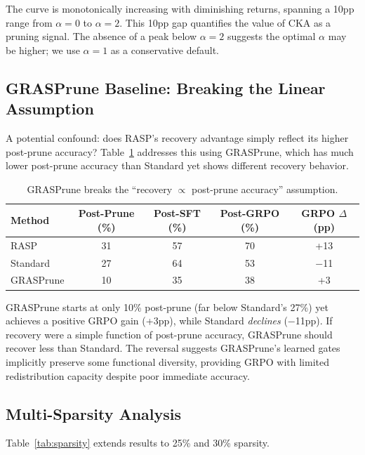 \documentclass[11pt,a4paper]{article}
\newcommand{\method}{RASP}
\begin{document}
The curve is monotonically increasing with diminishing returns, spanning a 10pp range from $\alpha=0$ to $\alpha=2$. This 10pp gap quantifies the value of CKA as a pruning signal. The absence of a peak below $\alpha=2$ suggests the optimal $\alpha$ may be higher; we use $\alpha=1$ as a conservative default.

\subsection{GRASPrune Baseline: Breaking the Linear Assumption}
\label{sec:graspprune}

A potential confound: does \method{}'s recovery advantage simply reflect its higher post-prune accuracy? Table~\ref{tab:graspprune} addresses this using GRASPrune, which has much lower post-prune accuracy than Standard yet shows different recovery behavior.

\begin{table}[t]
\centering
\small
\caption{GRASPrune breaks the ``recovery $\propto$ post-prune accuracy'' assumption.}
\label{tab:graspprune}
\begin{tabular}{lcccc}
\toprule
\textbf{Method} & \textbf{Post-Prune (\%)} & \textbf{Post-SFT (\%)} & \textbf{Post-GRPO (\%)} & \textbf{GRPO $\Delta$ (pp)} \\
\midrule
\method{} & 31 & 57 & 70 & +13 \\
Standard & 27 & 64 & 53 & $-$11 \\
GRASPrune & 10 & 35 & 38 & +3 \\
\bottomrule
\end{tabular}
\end{table}

GRASPrune starts at only 10\% post-prune (far below Standard's 27\%) yet achieves a positive GRPO gain (+3pp), while Standard \emph{declines} ($-$11pp). If recovery were a simple function of post-prune accuracy, GRASPrune should recover less than Standard. The reversal suggests GRASPrune's learned gates implicitly preserve some functional diversity, providing GRPO with limited redistribution capacity despite poor immediate accuracy.

\subsection{Multi-Sparsity Analysis}
\label{sec:sparsity}

Table~\ref{tab:sparsity} extends results to 25\% and 30\% sparsity.
\end{document}
